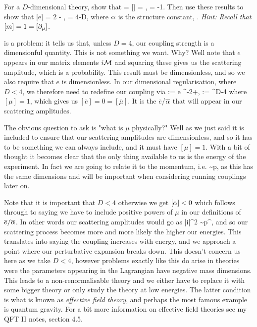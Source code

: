 \bbox 
    For a $D$-dimensional theory, show that 
    \bse 
        [\psi] = [\overline{\psi}] = , \qand [A_{\mu}] = -1.
    \ese 
    Then use these results to show that 
    \be
    \label{eqn:eDimensions}
        [e] = 2 - , \qquad \implies \qquad [\a] = 4-D,
    \ee 
    where $\alpha$ is the structure constant, . \textit{Hint: Recall that $[m]=1=[\partial_{\mu}]$.}
\ebox 

 is a problem: it tells us that, unless $D=4$, our coupling strength is a dimensionful quantity. This is not something we want. Why? Well note that $e$ appears in our matrix elements $i\mathcal{M}$ and squaring these gives us the scattering amplitude, which is a probability. This result must be dimensionless, and so we also require that $e$ is dimensionless. In our dimensional regularisation, where $D<4$, we therefore need to redefine our coupling via 
\bse 
     := e \mu^{-2+}, \qquad  \overline{\a} := \a \mu^{D-4}
\ese 
where $[\mu]=1$, which gives us $[\overline{e}]=0=[\overline{\mu}]$. It is the $\overline{e}$/$\overline{\alpha}$ that will appear in our scattering amplitudes.

The obvious question to ask is "what is $\mu$ physically?" Well as we just said it is included to ensure that our scattering amplitudes are dimensionless, and so it has to be something we can always include, and it must have $[\mu]=1$. With a bit of thought it becomes clear that the only thing available to us is the energy of the experiment. In fact we are going to relate it to the momentum, i.e. 
\be 
\label{eqn:muMomentumRelation}
    \mu \sim p,
\ee 
as this has the same dimensions and will be important when considering running couplings later on. 

\br 
    Note that it is important that $D<4$ otherwise we get $[\alpha]<0$ which follows through to saying we have to include positive powers of $\mu$ in our definitions of $\overline{e}/\overline{\alpha}$. In other words our scattering amplitudes would go as 
    \bse 
        |i\cM|^2 \sim p^{},
    \ese 
    and so our scattering process becomes more and more likely the higher our energies. This translates into saying the coupling increases with energy, and we approach a point where our perturbative expansion breaks down. This doesn't concern us here as we take $D<4$, however problems exactly like this do arise in theories were the parameters appearing in the Lagrangian have negative mass dimensions. This leads to a non-renormalisable theory and we either have to replace it with some bigger theory or only study the theory at low energies. The latter condition is what is known as \textit{effective field theory}, and perhaps the most famous example is quantum gravity. For a bit more information on effective field theories see my QFT II notes, section 4.5.
\er 

